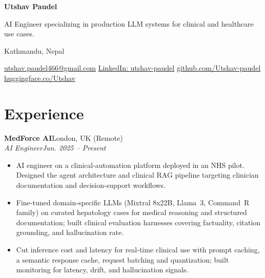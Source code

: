 \documentclass[11pt,a4paper]{article}
\newcommand{\role}[4]{%
  \noindent\textbf{#1}\hfill #2\\[1pt]
  \textit{#3}\hfill \textit{#4}\par
  \vspace{2pt}
}
\newenvironment{bullets}{%
  \vspace{-2pt}
  \begin{itemize}[leftmargin=14pt, itemsep=1pt, topsep=2pt, label={\textbullet}]
}{\end{itemize}\vspace{3pt}}
\begin{document}
\begin{center}
  {\fontsize{22}{26}\selectfont\bfseries Utshav Paudel\par}
  \vspace{3pt}
  {\color{muted}\small AI Engineer specializing in production LLM systems for clinical and healthcare use cases.\par}
  \vspace{4pt}
  Kathmandu, Nepal\par
  \vspace{2pt}
  \href{mailto:utshav.paudel466@gmail.com}{utshav.paudel466@gmail.com} \textbar{}
  \href{https://linkedin.com/in/utshav-paudel}{LinkedIn: utshav-paudel} \textbar{}
  \href{https://github.com/Utshav-paudel}{github.com/Utshav-paudel} \textbar{}
  \href{https://huggingface.co/Utshav}{huggingface.co/Utshav}
\end{center}

\section*{Experience}

\role{MedForce AI}{London, UK (Remote)}{AI Engineer}{Jun. 2025 -- Present}
\begin{bullets}
  \item AI engineer on a clinical-automation platform deployed in an NHS pilot. Designed the agent architecture and clinical RAG pipeline targeting clinician documentation and decision-support workflows.
  \item Fine-tuned domain-specific LLMs (Mixtral 8x22B, Llama~3, Command~R family) on curated hepatology cases for medical reasoning and structured documentation; built clinical evaluation harnesses covering factuality, citation grounding, and hallucination rate.
  \item Cut inference cost and latency for real-time clinical use with prompt caching, a semantic response cache, request batching and quantization; built monitoring for latency, drift, and hallucination signals.
\end{bullets}
\end{document}
